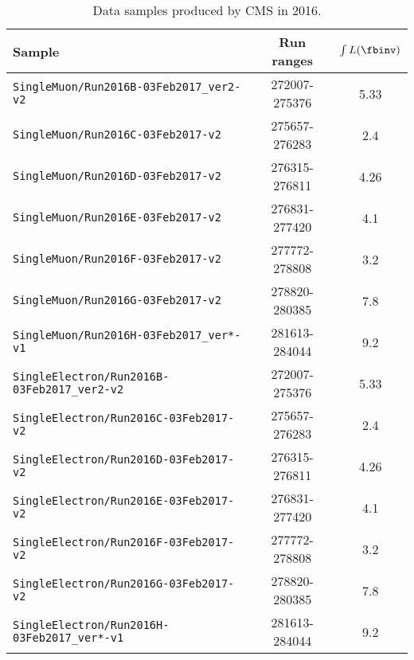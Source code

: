\begin{table}[ht]
    \centering
    \setlength{\tabcolsep}{1em}
    \renewcommand{\arraystretch}{1.1}
    \caption{Data samples produced by CMS in 2016.} \label{tab:analysis:dataset:data2016}
    
    \begin{tabular}{l c c}
        \hline
        Sample                                              & Run ranges    & $\int L (\fbinv)$ \\
        \hline
        \texttt{SingleMuon/Run2016B-03Feb2017\_ver2-v2}     & 272007-275376 & 5.33                \\
        \texttt{SingleMuon/Run2016C-03Feb2017-v2}           & 275657-276283 & 2.4                 \\
        \texttt{SingleMuon/Run2016D-03Feb2017-v2}           & 276315-276811 & 4.26                \\
        \texttt{SingleMuon/Run2016E-03Feb2017-v2}           & 276831-277420 & 4.1                 \\
        \texttt{SingleMuon/Run2016F-03Feb2017-v2}           & 277772-278808 & 3.2                 \\
        \texttt{SingleMuon/Run2016G-03Feb2017-v2}           & 278820-280385 & 7.8                 \\
        \texttt{SingleMuon/Run2016H-03Feb2017\_ver*-v1}     & 281613-284044 & 9.2                 \\
        \hline
        \texttt{SingleElectron/Run2016B-03Feb2017\_ver2-v2} & 272007-275376 & 5.33                  \\
        \texttt{SingleElectron/Run2016C-03Feb2017-v2}       & 275657-276283 & 2.4                   \\
        \texttt{SingleElectron/Run2016D-03Feb2017-v2}       & 276315-276811 & 4.26                  \\
        \texttt{SingleElectron/Run2016E-03Feb2017-v2}       & 276831-277420 & 4.1                   \\
        \texttt{SingleElectron/Run2016F-03Feb2017-v2}       & 277772-278808 & 3.2                   \\
        \texttt{SingleElectron/Run2016G-03Feb2017-v2}       & 278820-280385 & 7.8                   \\
        \texttt{SingleElectron/Run2016H-03Feb2017\_ver*-v1} & 281613-284044 & 9.2                   \\
        \hline
    \end{tabular}
\end{table}
